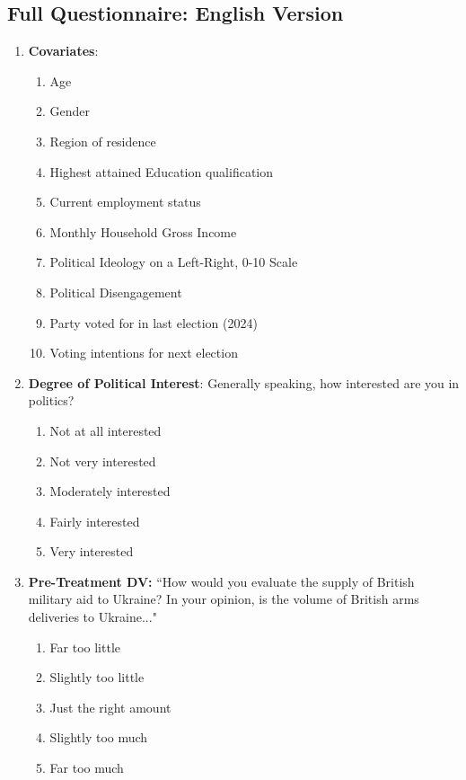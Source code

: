 \begin{appendices}
\section{Full Questionnaire: English Version}
\begin{enumerate}
    \item \textbf{Covariates}:
    \begin{enumerate}
        \item Age
        \item Gender
        \item Region of residence
        \item Highest attained Education qualification
        \item Current employment status 
        \item Monthly Household Gross Income
        \item Political Ideology on a Left-Right, 0-10 Scale
        \item Political Disengagement
        \item Party voted for in last election (2024) 
        \item Voting intentions for next election 
    \end{enumerate}
    \item \textbf{Degree of Political Interest}: Generally speaking, how interested are you in politics?
    \begin{enumerate}
        \item Not at all interested
        \item Not very interested
        \item Moderately interested
        \item Fairly interested
        \item Very interested 
    \end{enumerate}
    \item \textbf{Pre-Treatment DV:}  ``How would you evaluate the supply of British military aid to Ukraine? In your opinion, is the volume of British arms deliveries to Ukraine..." 
        \begin{enumerate}
            \item Far too little
            \item Slightly too little
            \item Just the right amount
            \item Slightly too much
            \item Far too much 
        \end{enumerate}

\end{enumerate}
\end{appendices}
